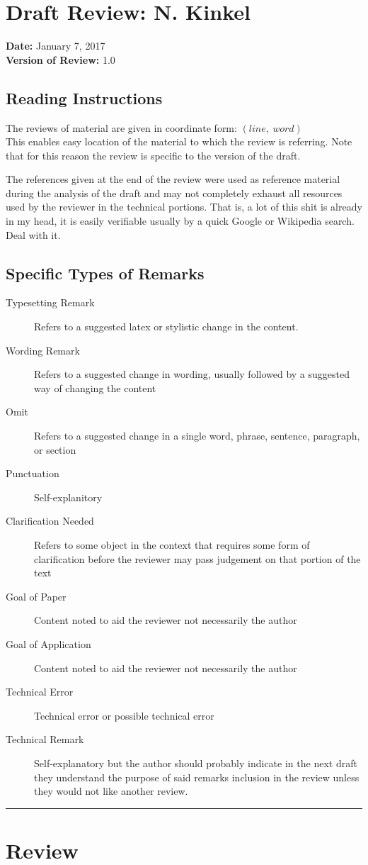\documentclass[10pt]{article}
\begin{document}
\section*{Draft Review: N. Kinkel}
\textbf{Date:} January 7, 2017 \\
\textbf{Version of Review:} 1.0 \\
\medskip

\subsection*{Reading Instructions}

The reviews of material are given in coordinate form: $(line, \ word)$ \\
This enables easy location of the material to which the review is referring. Note that for this reason the review is specific to the version of the draft. 

The references given at the end of the review were used as reference material during the analysis of the draft and may not completely exhaust all resources used by the reviewer in the technical portions. That is, a lot of this shit is already in my head, it is easily verifiable usually by a quick Google or Wikipedia search. Deal with it.

\subsection*{Specific Types of Remarks}

\begin{description}
    \item [Typesetting Remark] Refers to a suggested latex or stylistic change in the content.
    \item [Wording Remark] Refers to a suggested change in wording, usually followed by a suggested way of changing the content
    \item [Omit] Refers to a suggested change in a single word, phrase, sentence, paragraph, or section
    \item [Punctuation] Self-explanitory
    \item [Clarification Needed] Refers to some object in the context that requires some form of clarification before the reviewer may pass judgement on that portion of the text
    \item [Goal of Paper] Content noted to aid the reviewer not necessarily the author
    \item [Goal of Application]  Content noted to aid the reviewer not necessarily the author
    \item [Technical Error] Technical error or possible technical error
    \item [Technical Remark] Self-explanatory but the author should probably indicate in the next draft they understand the purpose of said remarks inclusion in the review unless they would not like another review.
\end{description}
\medskip


\bigskip
\hrule
\bigskip

\section*{Review}







\nocite{*}

\end{document}
